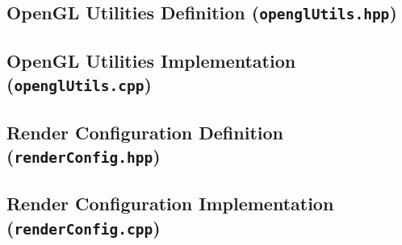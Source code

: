 \pagebreak

\subsection{OpenGL Utilities Definition (\texttt{openglUtils.hpp})}


\subsection{OpenGL Utilities Implementation (\texttt{openglUtils.cpp})}



\pagebreak

\subsection{Render Configuration Definition (\texttt{renderConfig.hpp})}


\subsection{Render Configuration Implementation (\texttt{renderConfig.cpp})}

